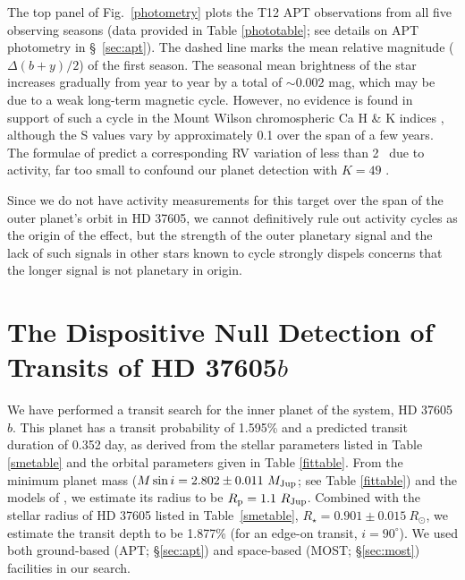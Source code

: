 The top panel of Fig.~\ref{photometry} plots the T12 APT observations
from all five observing seasons (data provided in Table
\ref{phototable}; see details on APT photometry in
\S~\ref{sec:apt}). The dashed line marks the mean relative magnitude
($\Delta(b+y)/2$) of the first season.  The seasonal mean brightness
of the star increases gradually from year to year by a total of
$\sim 0.002$ mag, which may be due to a weak long-term magnetic cycle.
However, no evidence is found in support of such a cycle in the Mount
Wilson chromospheric Ca {} H \& K indices \citep{svalue2010},
although the S values vary by approximately 0.1 over the span of a few
years. The formulae of \cite{2011A&A...528A.112L} predict a
corresponding RV variation of less than 2 \mps\ due to activity, far too
small to confound our planet detection with $K=49$ \mps.

Since we do not have activity measurements for this target over the
span of the outer planet's orbit in HD 37605, we cannot definitively
rule out activity cycles as the origin of the effect, but the strength
of the outer planetary signal and the lack of such signals in other
stars known to cycle strongly dispels concerns that the longer signal
is not planetary in origin.



\section{The Dispositive Null Detection of Transits of HD 37605\lowercase{$b$}}\label{sec:photo}


We have performed a transit search for the inner planet of the system,
HD 37605$b$. This planet has a transit probability of 1.595\% and a
predicted transit duration of 0.352 day, as derived from the stellar 
parameters listed in Table \ref{smetable} and the orbital parameters given 
in Table \ref{fittable}. From the minimum planet mass ($M\sin{i} = 2.802
\pm 0.011\ M_{\rm Jup}$; see Table \ref{fittable}) and the models of
\cite{planetradius2003}, we estimate its radius to be $R_{\rm p}= 1.1\ R_{\rm Jup}$. 
Combined with the stellar radius of HD 37605 listed in Table~\ref{smetable}, 
$R_\star=0.901 \pm 0.015\ R_{\odot}$, we estimate the transit depth to be 
1.877\% (for an edge-on transit, $i=90^{\circ}$). We used both ground-based 
(APT; \S \ref{sec:apt}) and space-based (MOST; \S \ref{sec:most}) 
facilities in our search. 


